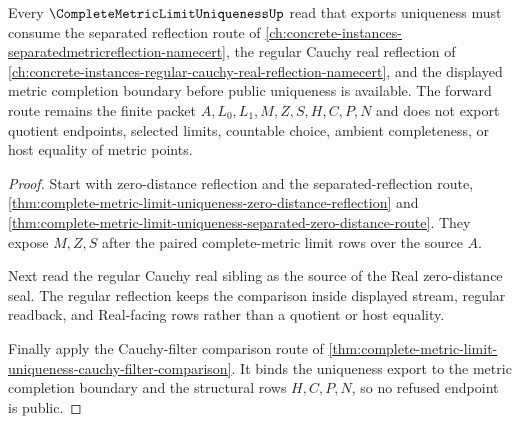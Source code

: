 \begin{theorem}
\label{thm:complete-metric-limit-uniqueness-forward-route}
Every $\CompleteMetricLimitUniquenessUp$ read that exports uniqueness must consume the separated reflection route of \autoref{ch:concrete-instances-separatedmetricreflection-namecert}, the regular Cauchy real reflection of \autoref{ch:concrete-instances-regular-cauchy-real-reflection-namecert}, and the displayed metric completion boundary before public uniqueness is available. The forward route remains the finite packet $A,L_{0},L_{1},M,Z,S,H,C,P,N$ and does not export quotient endpoints, selected limits, countable choice, ambient completeness, or host equality of metric points.
\end{theorem}
\begin{proof}
Start with zero-distance reflection and the separated-reflection route, \autoref{thm:complete-metric-limit-uniqueness-zero-distance-reflection} and \autoref{thm:complete-metric-limit-uniqueness-separated-zero-distance-route}. They expose $M,Z,S$ after the paired complete-metric limit rows over the source $A$.

Next read the regular Cauchy real sibling as the source of the Real zero-distance seal. The regular reflection keeps the comparison inside displayed stream, regular readback, and Real-facing rows rather than a quotient or host equality.

Finally apply the Cauchy-filter comparison route of \autoref{thm:complete-metric-limit-uniqueness-cauchy-filter-comparison}. It binds the uniqueness export to the metric completion boundary and the structural rows $H,C,P,N$, so no refused endpoint is public.
\end{proof}

